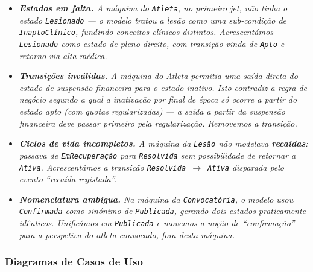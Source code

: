 \begin{itemize}
    \item \textit{\textbf{Estados em falta.} A máquina do \texttt{Atleta}, no primeiro \textit{jet}, não tinha o estado \texttt{Lesionado} --- o modelo tratou a lesão como uma sub-condição de \texttt{InaptoClínico}, fundindo conceitos clínicos distintos. Acrescentámos \texttt{Lesionado} como estado de pleno direito, com transição vinda de \texttt{Apto} e retorno via alta médica.}
    \item \textit{\textbf{Transições inválidas.} A máquina do Atleta permitia uma saída direta do estado de suspensão financeira para o estado inativo. Isto contradiz a regra de negócio segundo a qual a inativação por final de época só ocorre a partir do estado apto (com quotas regularizadas) --- a saída a partir da suspensão financeira deve passar primeiro pela regularização. Removemos a transição.}
    \item \textit{\textbf{Ciclos de vida incompletos.} A máquina da \texttt{Lesão} não modelava \textbf{recaídas}: passava de \texttt{EmRecuperação} para \texttt{Resolvida} sem possibilidade de retornar a \texttt{Ativa}. Acrescentámos a transição \texttt{Resolvida $\rightarrow$ Ativa} disparada pelo evento ``recaída registada''.}
    \item \textit{\textbf{Nomenclatura ambígua.} Na máquina da \texttt{Convocatória}, o modelo usou \texttt{Confirmada} como sinónimo de \texttt{Publicada}, gerando dois estados praticamente idênticos. Unificámos em \texttt{Publicada} e movemos a noção de ``confirmação'' para a perspetiva do atleta convocado, fora desta máquina.}
\end{itemize}

\subsubsection*{Diagramas de Casos de Uso}


